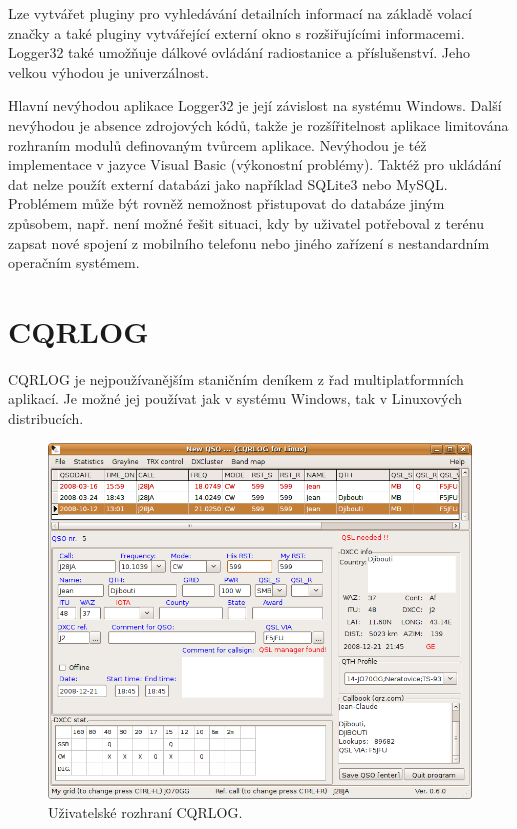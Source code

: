 Lze vytvářet pluginy pro vyhledávání detailních informací na základě volací značky a také pluginy vytvářející externí okno
s rozšiřujícími informacemi. Logger32 také umožňuje dálkové ovládání
radiostanice a příslušenství. Jeho velkou výhodou je univerzálnost.

Hlavní nevýhodou aplikace Logger32 je její závislost na systému Windows. Další nevýhodou je absence zdrojových kódů, takže je rozšířitelnost aplikace limitována rozhraním modulů definovaným
tvůrcem aplikace. Nevýhodou je též implementace v jazyce Visual Basic
(výkonostní problémy).
Taktéž pro ukládání dat nelze použít externí databázi jako například SQLite3
nebo MySQL. Problémem může být rovněž nemožnost přistupovat do databáze jiným
způsobem, např. není možné řešit situaci, kdy by uživatel potřeboval z terénu 
zapsat %
nové spojení z mobilního telefonu nebo jiného zařízení s nestandardním operačním systémem.

\section{CQRLOG}

CQRLOG je nejpoužívanějším staničním deníkem z řad multiplatformních aplikací. Je možné jej používat jak v systému
Windows, tak v Linuxových distribucích.

\begin{figure}[h]
\centering
\includegraphics[trim=0cm 0cm 0cm 0cm, scale=0.5]{fig/cqrlog}
\caption{Uživatelské rozhraní CQRLOG.}
\label{fig:cqrlog}
\end{figure}

